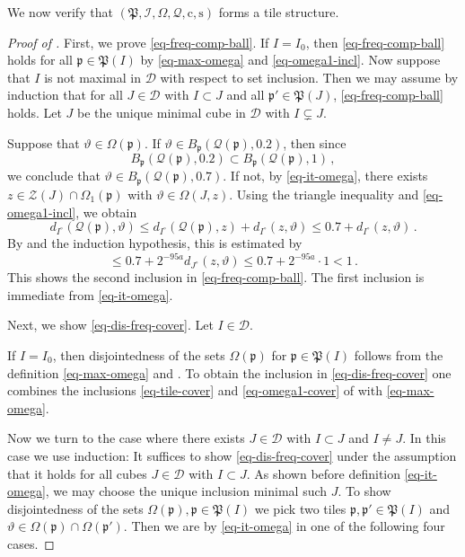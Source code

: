 \documentclass[10pt,a4paper]{article}
\theoremstyle{plain}
\theoremstyle{definition}
\numberwithin{equation}{subsection}
\newcommand{\fp}{{\mathfrak p}}
\newcommand{\fP}{{\mathfrak P}}
\newcommand{\pc}{{\mathrm{c}}}
\newcommand{\ps}{{\mathrm{s}}}
\newcommand{\fc}{{\Omega}}
\newcommand{\scI}{{\mathcal{I}}} %
\newcommand{\mfa}{{\vartheta}}
\newcommand{\fcc}{{\mathcal{Q}}}
\newcommand{\proves}[1]{}
\newcommand{\leanok}{}
\begin{document}
We now verify that $(\fP,\scI,\fc,\fcc,\pc,\ps)$ forms a tile structure.
\begin{proof}[Proof of ]
    \leanok
    \proves{tile-structure}
    First, we prove \eqref{eq-freq-comp-ball}. If $I =I_0$, then \eqref{eq-freq-comp-ball} holds for all $\fp \in \fP(I)$ by \eqref{eq-max-omega} and \eqref{eq-omega1-incl}. Now suppose that $I$ is not maximal in $\mathcal{D}$ with respect to set inclusion. Then we may assume by induction that for all $J \in \mathcal{D}$ with $I \subset J$ and all $\fp' \in \fP(J)$, \eqref{eq-freq-comp-ball} holds. Let $J$ be the unique minimal cube in $\mathcal{D}$ with $I \subsetneq J$.

    Suppose that $\mfa \in \Omega(\fp)$. If $\mfa\in B_{\fp}(\mathcal{Q}(\fp), 0.2)$, then since
    \begin{equation*}
        B_{\fp}(\mathcal{Q}(\fp), 0.2)\subset B_{\fp}(\mathcal{Q}(\fp), 1)\, ,
    \end{equation*}
    we conclude that $\mfa\in B_{\fp}(\mathcal{Q}(\fp), 0.7)$. If not, by \eqref{eq-it-omega}, there exists $z \in \mathcal{Z}(J) \cap \Omega_1(\fp)$ with $\mfa \in \Omega(J,z)$. Using the triangle inequality and \eqref{eq-omega1-incl}, we obtain
    $$
        d_{I^\circ}(\fcc(\fp),\mfa) \le d_{I^\circ}(\fcc(\fp), z) + d_{I^\circ}(z, \mfa) \le 0.7 + d_{I^\circ}(z, \mfa)\,.
    $$
    By  and the induction hypothesis, this is estimated by
    $$
        \le 0.7 + 2^{-95a} d_{J^\circ}(z,\mfa) \le 0.7 + 2^{-95a}\cdot 1 < 1\,.
    $$
    This shows the second inclusion in \eqref{eq-freq-comp-ball}. The first inclusion is immediate from \eqref{eq-it-omega}.

    Next, we show \eqref{eq-dis-freq-cover}. Let $I \in \mathcal{D}$.

    If $I = I_0$, then disjointedness of the sets $\fc(\fp)$ for $\fp \in \fP(I)$ follows from the definition \eqref{eq-max-omega} and . To obtain the inclusion in \eqref{eq-dis-freq-cover} one combines the inclusions \eqref{eq-tile-cover} and \eqref{eq-omega1-cover}
    of  with \eqref{eq-max-omega}.

    Now we turn to the case where there exists $J \in \mathcal{D}$ with $I \subset J$ and $I\ne J$. In this case we use induction: It suffices to show \eqref{eq-dis-freq-cover} under the assumption that it holds for all cubes $J \in \mathcal{D}$ with $I \subset J$. As shown before definition \eqref{eq-it-omega}, we may choose the unique inclusion minimal such $J$. To show disjointedness of the sets $\fc(\fp), \fp \in \fP(I)$ we pick two tiles $\fp, \fp' \in \fP(I)$ and $\mfa \in \fc(\fp) \cap \fc(\fp')$.
    Then we are by \eqref{eq-it-omega} in one of the following four cases.


\end{proof}
\end{document}
